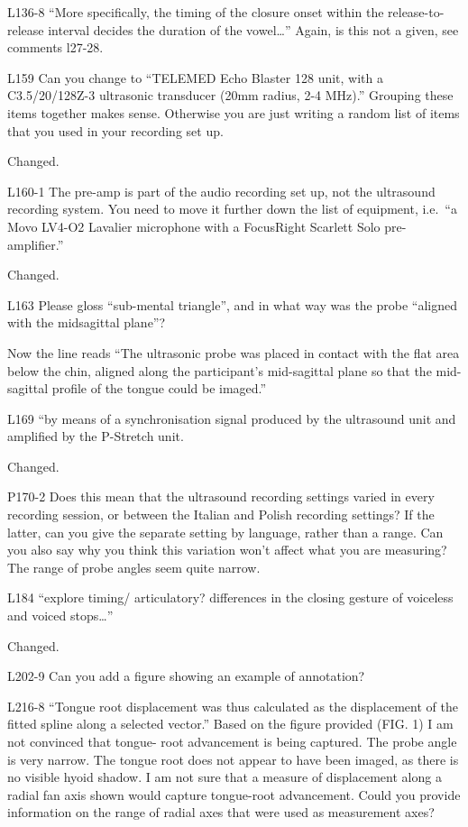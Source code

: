 \documentclass[]{article}
\begin{document}
L136-8 ``More specifically, the timing of the closure onset within the
release-to-release interval decides the duration of the vowel\ldots{}''
Again, is this not a given, see comments l27-28.

L159 Can you change to ``TELEMED Echo Blaster 128 unit, with a
C3.5/20/128Z-3 ultrasonic transducer (20mm radius, 2-4 MHz).'' Grouping
these items together makes sense. Otherwise you are just writing a
random list of items that you used in your recording set up.

\color{plum}

Changed. \color{black}

L160-1 The pre-amp is part of the audio recording set up, not the
ultrasound recording system. You need to move it further down the list
of equipment, i.e.~``a Movo LV4-O2 Lavalier microphone with a FocusRight
Scarlett Solo pre-amplifier.''

\color{plum}

Changed. \color{black}

L163 Please gloss ``sub-mental triangle'', and in what way was the probe
``aligned with the midsagittal plane''?

\color{plum}

Now the line reads ``The ultrasonic probe was placed in contact with the
flat area below the chin, aligned along the participant's mid-sagittal
plane so that the mid-sagittal profile of the tongue could be imaged.''
\color{black}

L169 ``by means of a synchronisation signal produced by the ultrasound
unit and amplified by the P-Stretch unit.

\color{plum}

Changed. \color{black}

P170-2 Does this mean that the ultrasound recording settings varied in
every recording session, or between the Italian and Polish recording
settings? If the latter, can you give the separate setting by language,
rather than a range. Can you also say why you think this variation won't
affect what you are measuring? The range of probe angles seem quite
narrow.

L184 ``explore timing/ articulatory? differences in the closing gesture
of voiceless and voiced stops\ldots{}''

\color{plum}

Changed. \color{black}

L202-9 Can you add a figure showing an example of annotation?

L216-8 ``Tongue root displacement was thus calculated as the
displacement of the fitted spline along a selected vector.'' Based on
the figure provided (FIG. 1) I am not convinced that tongue- root
advancement is being captured. The probe angle is very narrow. The
tongue root does not appear to have been imaged, as there is no visible
hyoid shadow. I am not sure that a measure of displacement along a
radial fan axis shown would capture tongue-root advancement. Could you
provide information on the range of radial axes that were used as
measurement axes?
\end{document}
